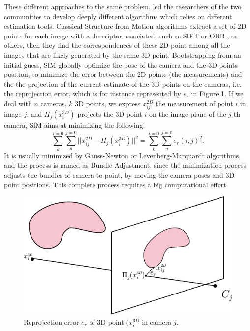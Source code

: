 These different approaches to the same problem, led the researchers of the two communities to develop deeply different algorithms which relies on different estimation tools.
Classical Structure from Motion algorithms \cite{triggs2000bundle,sibley2009adaptive,wu2011multicore} extract a set of 2D points for each image with a descriptor associated, such as SIFT \cite{sift} or ORB \cite{orb}, or others, then they find the correspondences of these 2D point among all the images that are likely generated by the same 3D point. Bootstrapping from an initial guess, SfM globally optimize the pose of the camera and the 3D points position, to minimize the error between the 2D points (the measurements) and the the projection of the current estimate of the 3D points on the cameras, i.e. the reprojection error, which is for instance represented by $e_r$ in Figure \ref{fig:reprojectionerror}.
If we deal with $n$ cameras, $k$ 3D points, we express $x_{ij}^{2D}$ the measurement of point $i$ in image $j$, and $\Pi_j(x_i^{3D})$ projects the 3D point $i$ on the image plane of the $j$-th camera, SfM aims at minimizing the following:
\[
\sum_{k}^{i=0}\sum_{n}^{j=0}||x_{ij}^{2D} - \Pi_j(x_i^{3D})||^2 = \sum_{k}^{i=0}\sum_{n}^{j=0}e_r(i,j) ^2.
\]
It is usually minimized by Gauss-Newton or Levenberg-Marquardt algorithms, and the process is named as Bundle Adjustment, since the minimization process adjusts the bundles of camera-to-point, by moving the camera poses and 3D point positions. This complete process requires a big computational effort.

\begin{figure}[t]
\includegraphics[width=0.99\columnwidth]{./img/ch_soa/reproj}
 \caption{Reprojection error $e_r$ of 3D point $(x_i^{3D}$ in camera $j$.} 
    \label{fig:reprojectionerror}
\end{figure}



